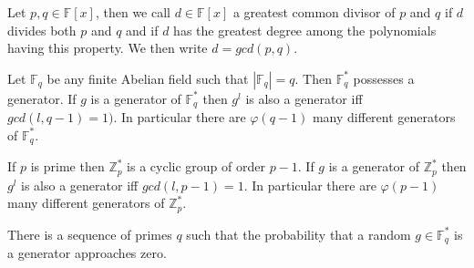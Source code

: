 \documentclass[a4paper]{article}
\begin{document}
\begin{definition}
Let $p, q \in \mathbb{F}[x]$, then we call $d \in \mathbb{F}[x]$ a greatest common divisor of $p$ and $q$ if $d$ divides both $p$ and $q$ and if $d$ has the greatest degree among the polynomials having this property. We then write $d = gcd(p, q)$.
\end{definition}


\begin{theorem}
Let $\mathbb{F}_{q}$ be any finite Abelian field such that $|\mathbb{F}_{q}| = q$. Then $\mathbb{F}_{q}^{*}$ possesses a generator. If $g$ is a generator of $\mathbb{F}_{q}^{*}$ then $g^{l}$ is also a generator iff $gcd(l, q - 1) = 1)$. In particular there are $\varphi (q - 1)$ many different generators of $\mathbb{F}_{q}^{*}$.
\end{theorem}


\begin{corollary}
If $p$ is prime then $\mathbb{Z}_{p}^{*}$ is a cyclic group of order $p - 1$. If $g$ is a generator of $\mathbb{Z}_{p}^{*}$ then $g^{l}$ is also a generator iff $gcd(l, p - 1) = 1$. In particular there are $\varphi (p - 1)$ many different generators of $\mathbb{Z}_{p}^{*}$.
\end{corollary}

\begin{theorem}
There is a sequence of primes $q$ such that the probability that a random $g \in \mathbb{F}_{q}^{*}$ is a generator approaches zero.
\end{theorem}
\end{document}
